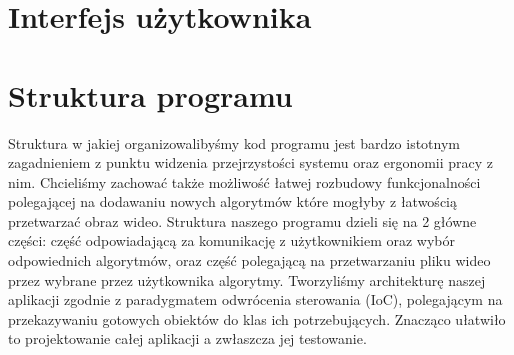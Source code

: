 \documentclass[twoside]{projektInzynierskiMS}
\begin{document}
\section{Interfejs użytkownika}


\section{Struktura programu}

Struktura w jakiej organizowalibyśmy kod programu jest bardzo istotnym zagadnieniem z punktu widzenia przejrzystości systemu oraz ergonomii pracy z nim. Chcieliśmy zachować także możliwość łatwej rozbudowy funkcjonalności polegającej na dodawaniu nowych algorytmów które mogłyby z łatwością przetwarzać obraz wideo. Struktura naszego programu dzieli się na 2 główne części: część odpowiadającą za komunikację z użytkownikiem oraz wybór odpowiednich algorytmów, oraz część polegającą na przetwarzaniu pliku wideo przez wybrane przez użytkownika algorytmy. Tworzyliśmy architekturę naszej aplikacji zgodnie z paradygmatem odwrócenia sterowania (IoC), polegającym na przekazywaniu gotowych obiektów do klas ich potrzebujących. Znacząco ułatwiło to projektowanie całej aplikacji a zwłaszcza jej testowanie.
\end{document}

